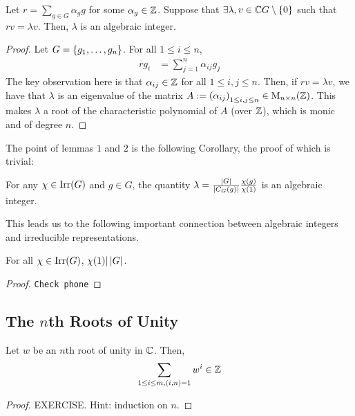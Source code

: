 \begin{lemma}
    Let $r = \sum_{g \in G} \alpha_g g$ for some $\alpha_g \in \mathbb{Z}$. Suppose that $\exists \lambda, v \in \mathbb{C} G \setminus \left\{ 0 \right\}$ such that $rv = \lambda v$. Then, $\lambda$ is an algebraic integer.
\end{lemma}
\begin{proof}
    Let $G = \left\{ g_1, \ldots, g_n \right\}$. For all $1 \leq i \leq n$,
    \begin{align*}
        r g_i &= \sum_{j=1}^{n} \alpha_{ij} g_j
    \end{align*}
    The key observation here is that $\alpha_{ij} \in \mathbb{Z}$ for all $1 \leq i,j \leq n$. %
    Then, if $rv = \lambda v$, we have that $\lambda$ is an eigenvalue of the matrix $A := \left( \alpha_{ij} \right)_{1 \leq i,j \leq n} \in \operatorname{M}_{{n} \times {n}}\!\left( {\mathbb{Z}} \right)$. This makes $\lambda$ a root of the characteristic polynomial of $A$ (over $\mathbb{Z}$), which is monic and of degree $n$.
\end{proof}

The point of lemmas $1$ and $2$ is the following Corollary, the proof of which is trivial:
\begin{corollary}\label{Ch2:Cor:lambda_Alg_Int}
    For any $\chi \in \operatorname{Irr}\!\left( G \right)$ and $g \in G$, the quantity $\lambda = \frac{\left\lvert G \right\rvert}{\left\lvert C_G(g) \right\rvert} \frac{\chi(g)}{\chi(1)}$ is an algebraic integer.
\end{corollary}
This leads us to the following important connection between algebraic integers and irreducible representations.

\begin{theorem} \label{Ch2:Thm:Char_div_Ord_Grp}
    For all $\chi \in \operatorname{Irr}\!\left( G \right)$, $\chi(1) \vert \left\lvert G \right\rvert$.
\end{theorem}
\begin{proof}
    \verb|Check phone|
\end{proof}

\subsection{The $n$th Roots of Unity}

\begin{lemma} \label{Ch3:Lem:Int_Sum_Coprime_Roots_Unity}
    Let $w$ be an $n$th root of unity in $\mathbb{C}$. Then,
    \begin{align*}
        \sum_{1 \leq i \leq m, \left( i,n \right) = 1} w^i \in \mathbb{Z}
    \end{align*}
\end{lemma}
\begin{proof}
    EXERCISE. Hint: induction on $n$.
\end{proof}

